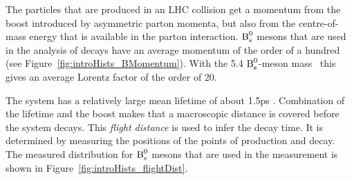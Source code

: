 The particles that are produced in an LHC collision get a momentum from the boost introduced by asymmetric parton momenta, but also from
the centre-of-mass energy that is available in the parton interaction. $\text{B}_\text{s}^\text{0}$ mesons that are used in the analysis of \BstoJpsiKK{}
decays have an average momentum of the order of a hundred \GeVc{} (see Figure~\ref{fig:introHists_BMomentum}). With the 5.4\unitsp\GeV{}
$\text{B}_\text{s}^\text{0}$-meson mass~\cite{PDG2012} this gives an average Lorentz factor of the order of 20.

The \BsBsbar{} system has a relatively large mean lifetime of about 1.5\unitsp{}ps \cite{Amhis:2012bh}. Combination of the lifetime and the
boost makes that a macroscopic distance is covered before the system decays. This \emph{flight distance} is used to infer the decay time.
It is determined by measuring the positions of the points of production and decay. The measured distribution for $\text{B}_\text{s}^\text{0}$ mesons that are used
in the \BstoJpsiKK{} measurement is shown in Figure~\ref{fig:introHists_flightDist}.

